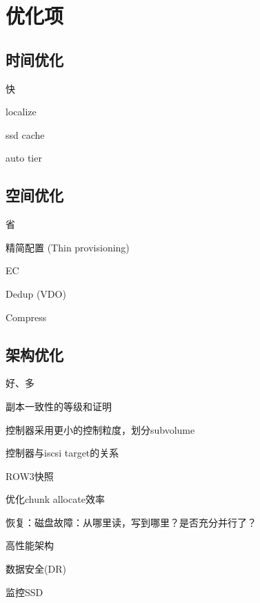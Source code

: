 \chapter{优化项}

\section{时间优化}

快

\begin{enumbox}
\item localize
\item ssd cache
\item auto tier
\end{enumbox}

\section{空间优化}

省

\begin{enumbox}
\item 精简配置 (Thin provisioning)
\item EC
\item Dedup (VDO)
\item Compress
\end{enumbox}

\section{架构优化}

好、多

\begin{enumbox}
\item 副本一致性的等级和证明
\item 控制器采用更小的控制粒度，划分subvolume
\item 控制器与iscsi target的关系
\item ROW3快照
\item 优化chunk allocate效率
\item 恢复：磁盘故障：从哪里读，写到哪里？是否充分并行了？
\item 高性能架构
\item 数据安全(DR)
\item 监控SSD
\end{enumbox}


